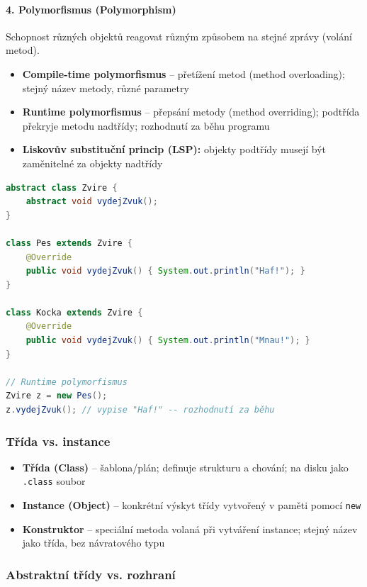 \paragraph{4. Polymorfismus (Polymorphism)}
Schopnost různých objektů reagovat různým způsobem na stejné zprávy (volání metod).
\begin{itemize}
  \item \textbf{Compile-time polymorfismus} -- přetížení metod (method overloading); stejný název metody,
    různé parametry
  \item \textbf{Runtime polymorfismus} -- přepsání metody (method overriding); podtřída překryje metodu
    nadtřídy; rozhodnutí za běhu programu
  \item \textbf{Liskovův substituční princip (LSP):} objekty podtřídy musejí být zaměnitelné za objekty nadtřídy
\end{itemize}

\begin{lstlisting}[language=Java, caption=Polymorfismus v Javě]
abstract class Zvire {
    abstract void vydejZvuk();
}

class Pes extends Zvire {
    @Override
    public void vydejZvuk() { System.out.println("Haf!"); }
}

class Kocka extends Zvire {
    @Override
    public void vydejZvuk() { System.out.println("Mnau!"); }
}

// Runtime polymorfismus
Zvire z = new Pes();
z.vydejZvuk(); // vypise "Haf!" -- rozhodnutí za běhu
\end{lstlisting}

\subsubsection{Třída vs. instance}

\begin{itemize}
  \item \textbf{Třída (Class)} -- šablona/plán; definuje strukturu a chování; na disku jako \texttt{.class} soubor
  \item \textbf{Instance (Object)} -- konkrétní výskyt třídy vytvořený v paměti pomocí \texttt{new}
  \item \textbf{Konstruktor} -- speciální metoda volaná při vytváření instance; stejný název jako třída, bez návratového typu
\end{itemize}

\subsubsection{Abstraktní třídy vs. rozhraní}

